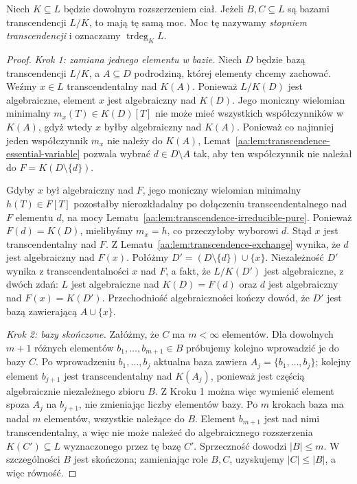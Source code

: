 \begin{twierdzenie}
\label{aa:tw:transcendence-degree}
Niech $K\subseteq L$ będzie dowolnym rozszerzeniem ciał.
Jeżeli $B,C\subseteq L$ są bazami transcendencji $L/K$,
to mają tę samą moc. Moc tę nazywamy
\emph{stopniem transcendencji} i oznaczamy $\operatorname{trdeg}_K L$.
\end{twierdzenie}
\begin{proof}
\emph{Krok 1: zamiana jednego elementu w bazie.}
Niech $D$ będzie bazą transcendencji $L/K$, a $A\subseteq D$
podrodziną, której elementy chcemy zachować. Weźmy
$x\in L$ transcendentalny nad $K(A)$.
Ponieważ $L/K(D)$ jest algebraiczne, element $x$ jest
algebraiczny nad $K(D)$. Jego moniczny wielomian minimalny
$m_x(T)\in K(D)[T]$ nie może mieć wszystkich współczynników
w $K(A)$, gdyż wtedy $x$ byłby algebraiczny nad $K(A)$.
Ponieważ co najmniej jeden współczynnik $m_x$ nie należy
do $K(A)$, Lemat~\ref{aa:lem:transcendence-essential-variable}
pozwala wybrać $d\in D\setminus A$ tak, aby ten
współczynnik nie należał do $F=K(D\setminus\{d\})$.

Gdyby $x$ był algebraiczny nad $F$, jego moniczny
wielomian minimalny $h(T)\in F[T]$ pozostałby nierozkładalny
po dołączeniu transcendentalnego nad $F$ elementu $d$,
na mocy Lematu~\ref{aa:lem:transcendence-irreducible-pure}.
Ponieważ $F(d)=K(D)$, mielibyśmy $m_x=h$, co przeczyłoby
wyborowi $d$. Stąd $x$ jest transcendentalny nad $F$.
Z Lematu~\ref{aa:lem:transcendence-exchange} wynika,
że $d$ jest algebraiczny nad $F(x)$.
Połóżmy $D'=(D\setminus\{d\})\cup\{x\}$.
Niezależność $D'$ wynika z transcendentalności $x$ nad $F$,
a fakt, że $L/K(D')$ jest algebraiczne, z dwóch zdań:
$L$ jest algebraiczne nad $K(D)=F(d)$ oraz $d$ jest algebraiczny
nad $F(x)=K(D')$. Przechodniość algebraiczności kończy dowód,
że $D'$ jest bazą zawierającą $A\cup\{x\}$.

\emph{Krok 2: bazy skończone.}
Załóżmy, że $C$ ma $m<\infty$ elementów.
Dla dowolnych $m+1$ różnych elementów $b_1,\ldots,b_{m+1}\in B$
próbujemy kolejno wprowadzić je do bazy $C$.
Po wprowadzeniu $b_1,\ldots,b_j$ aktualna baza zawiera
$A_j=\{b_1,\ldots,b_j\}$; kolejny element $b_{j+1}$ jest
transcendentalny nad $K(A_j)$, ponieważ jest częścią
algebraicznie niezależnego zbioru $B$.
Z Kroku 1 można więc wymienić element spoza $A_j$ na
$b_{j+1}$, nie zmieniając liczby elementów bazy.
Po $m$ krokach baza ma nadal $m$ elementów, wszystkie należące
do $B$. Element $b_{m+1}$ jest nad nimi transcendentalny,
a więc nie może należeć do algebraicznego rozszerzenia
$K(C')\subseteq L$ wyznaczonego przez tę bazę $C'$.
Sprzeczność dowodzi $|B|\le m$.
W szczególności $B$ jest skończona; zamieniając role $B,C$,
uzyskujemy $|C|\le|B|$, a więc równość.


\end{proof}
